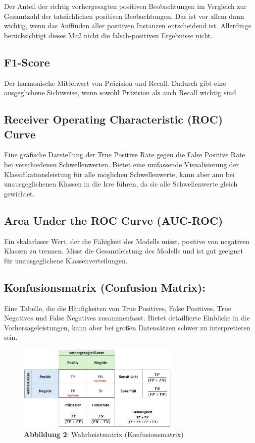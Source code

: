 \documentclass[
]{article}
\begin{document}
Der Anteil der richtig vorhergesagten positiven Beobachtungen im Vergleich zur Gesamtzahl der tatsächlichen positiven Beobachtungen. Das ist vor allem dann wichtig, wenn das Auffinden aller positiven Instanzen entscheidend ist. Allerdings berücksichtigt dieses Maß nicht die falsch-positiven Ergebnisse nicht.

\subsection{F1-Score}\label{f1-score}

Der harmonische Mittelwert von Präzision und Recall. Dadurch gibt eine ausgeglichene Sichtweise, wenn sowohl Präzision als auch Recall wichtig sind.

\subsection{Receiver Operating Characteristic (ROC) Curve}\label{receiver-operating-characteristic-roc-curve}

Eine grafische Darstellung der True Positive Rate gegen die False Positive Rate bei verschiedenen Schwellenwerten. Bietet eine umfassende Visualisierung der Klassifikationsleistung für alle möglichen Schwellenwerte, kann aber ann bei unausgeglichenen Klassen in die Irre führen, da sie alle Schwellenwerte gleich gewichtet.

\subsection{Area Under the ROC Curve (AUC-ROC)}\label{area-under-the-roc-curve-auc-roc}

Ein skalarloser Wert, der die Fähigkeit des Modells misst, positive von negativen Klassen zu trennen. Misst die Gesamtleistung des Modells und ist gut geeignet für unausgeglichene Klassenverteilungen.

\subsection{Konfusionsmatrix (Confusion Matrix):}\label{konfusionsmatrix-confusion-matrix}

Eine Tabelle, die die Häufigkeiten von True Positives, False Positives, True Negatives und False Negatives zusammenfasst. Bietet detaillierte Einblicke in die Vorhersageleistungen, kann aber bei großen Datensätzen schwer zu interpretieren sein.

\begin{figure}
\centering
\includegraphics[width=0.7\textwidth,height=\textheight]{Images/Konfussionsmatrix.jpg}
\caption{\textbf{Abbildung 2}: Wahrheistmatrix (Konfusionsmatrix)}
\end{figure}
\end{document}
